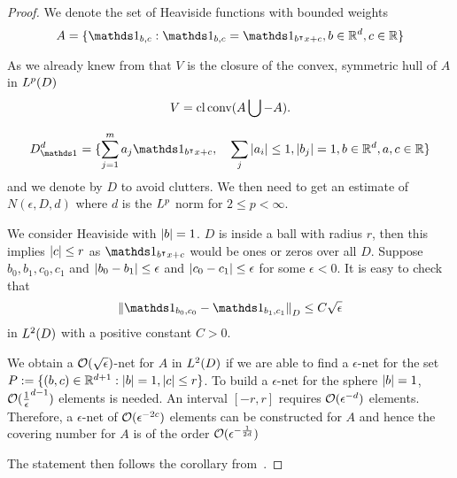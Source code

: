 \begin{proof}
    We denote the set of Heaviside functions with bounded weights
    \begin{equation}
        A = \{\indicator{b, c}: \indicator{b, c} = 
        \indicator{b\tr x + c}, b\in\R^d, c\in\R\}
    \end{equation}

    As we already knew from \cite{barronUniversalApproximationBounds1993} that
    $V$ is the closure of the convex, symmetric hull of $A$ in $L^{p}(D)$
    \begin{equation}
        V = \operatorname{cl}{\textrm{conv}(A \bigcup - A)}.
    \end{equation}

    \begin{equation}
        D^d_{\indicator{}} = \{\sum_{j=1}^m a_j \indicator{b\tr x + c}, 
        \quad \sum_j \abs{a_i} \leq 1, \abs{b_j} = 1,
        b\in\R^d,
        a, c\in\R\}
    \end{equation}
    and we denote by $D$ to avoid clutters. We then need to get an estimate of
    $N(\epsilon, D, d)$ where $d$ is the $L^{p}$ norm for $2 \leq p < \infty$.

    We consider Heaviside with $\left| b \right| = 1$. $D$ is inside a ball with radius
    $r$, then this implies $\left| c \right| \leq r$ as $\indicator{b\tr x + c}$ would
    be ones or zeros over all $D$. Suppose $b_0, b_1, c_0, c_1$ and $\left| b_0 -
    b_1 \right| \leq \epsilon$ and $\left| c_0 - c_1 \right| \leq \epsilon$ for some $\epsilon <
    0$. It is easy to check that 
    \begin{equation}
        \norm{\indicator{b_0, c_0} - \indicator{b_1, c_1}}_{D}
            \leq C \sqrt{\epsilon}
    \end{equation}
    in $L^{2}(D)$ with a positive constant $C>0$.
    
    We obtain a $\mathcal{O}(\sqrt{\epsilon})$-net for $A$ in $L^{2}(D)$ if we are able
    to find a $\epsilon$-net for the set $P:= \{(b,c)\in \mathbb{R}^{d+1}: \left| b \right| = 1,
    \left| c \right| \leq r\}$. To build a $\epsilon$-net for the sphere $\left| b \right|=1$,
    $\mathcal{O}(\frac{1}{\epsilon}^{d-1})$ elements is needed. An interval $[-r,r]$
    requires $\mathcal{O}(\epsilon^{-d})$ elements. Therefore, a $\epsilon$-net of
    $\mathcal{O}(\epsilon^{-2c})$ elements can be constructed for $A$ and hence the
    covering number for $A$ is of the order $\mathcal{O}(\epsilon^{-\frac{1}{2d}})$

    The statement then follows the corollary from~\cite[p.
    104]{makovozRandomApproximantsNeural1996}.
\end{proof}


